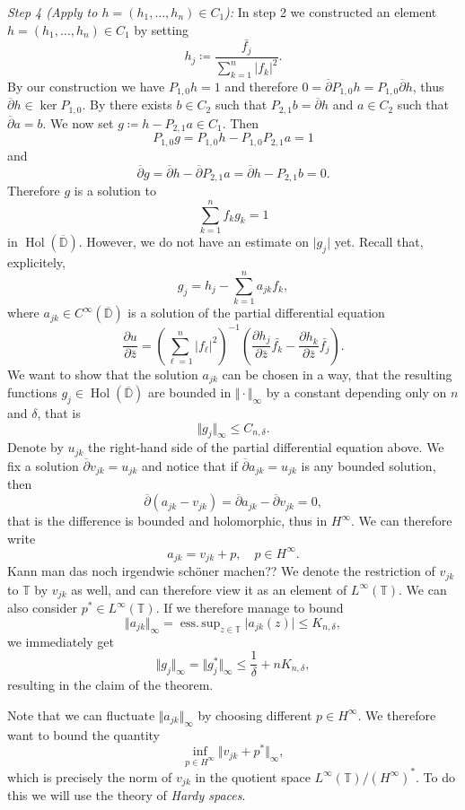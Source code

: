 \documentclass[letterpaper, 11pt]{article}
\newcommand{\D}{\mathbb{D}}
\newcommand{\T}{\mathbb{T}}
\newcommand{\1}{\mathds{1}}
\newcommand{\cl}[1]{\overline{#1}}
\newcommand{\Wirtzbar}[1][]{\frac{\partial #1}{\partial \bar{z}}}
\newcommand{\wirtzbar}{\overline{\partial}}
\DeclareMathOperator*{\Hol}{Hol}
\DeclareMathOperator*{\esssup}{ess.\,sup}
\newcommand{\todo}[1][Todo.]{{\color{red} #1}}
\theoremstyle{definition}
\newenvironment{innerproof}
 {\renewcommand{\qedsymbol}{}\proof}
 {\endproof}
\begin{document}
\begin{innerproof}[Proof (continued)]
  \textit{Step 4 (Apply to $h = (h_1, \dots, h_n) \in C_1$):} In step 2 we constructed an element $h = (h_1, \dots, h_n) \in C_1$ by setting
  $$ h_j \coloneqq \frac{\bar{f_j}}{\sum_{k=1}^n \vert f_k \vert^2}. $$
  By our construction we have $P_{1,0} h = 1$ and therefore $0 = \wirtzbar P_{1,0} h = P_{1,0} \wirtzbar h$, thus $\wirtzbar h \in \ker P_{1,0}$. By  there exists $b \in C_2$ such that $P_{2,1} b = \wirtzbar h$ and $a \in C_2$ such that $\wirtzbar a = b$. We now set $g \coloneqq h - P_{2,1} a \in C_1$. Then
  $$ P_{1,0} g = P_{1,0} h - P_{1,0} P_{2,1} a = 1 $$
  and
  $$ \wirtzbar g = \wirtzbar h - \wirtzbar P_{2,1} a = \wirtzbar h - P_{2,1} b = 0. $$
  Therefore $g$ is a solution to
  $$ \sum_{k=1}^n f_k g_k = 1 $$
  in $\Hol(\cl{\D})$. However, we do not have an estimate on $\vert g_j \vert$ yet. Recall that, explicitely,
  $$ g_j = h_j - \sum_{k=1}^n a_{jk} f_k, $$
  where $a_{jk} \in C^\infty(\cl{\D})$ is a solution of the partial differential equation
  $$ \Wirtzbar[u] = \left( \sum_{\ell=1}^n \vert f_\ell \vert^2 \right)^{-1} \left( \Wirtzbar[h_j] \bar{f_k} - \Wirtzbar[h_k] \bar{f_j} \right). $$
  We want to show that the solution $a_{jk}$ can be chosen in a way, that the resulting functions $g_j \in \Hol(\cl{\D})$ are bounded in $\Vert \cdot \Vert_\infty$ by a constant depending only on $n$ and $\delta$, that is
  $$ \Vert g_j \Vert_\infty \leq C_{n, \delta}. $$
  Denote by $u_{jk}$ the right-hand side of the partial differential equation above. We fix a solution $\wirtzbar v_{jk} = u_{jk}$ and notice that if $\wirtzbar a_{jk} = u_{jk}$ is any bounded solution, then
  $$ \wirtzbar (a_{jk} - v_{jk}) = \wirtzbar a_{jk} - \wirtzbar v_{jk} = 0, $$
  that is the difference is bounded and holomorphic, thus in $H^\infty$. We can therefore write
  $$ a_{jk} = v_{jk} + p, \quad p \in H^\infty. $$
  \todo[Kann man das noch irgendwie schöner machen??] We denote the restriction of $v_{jk}$ to $\T$ by $v_{jk}$ as well, and can therefore view it as an element of $L^\infty(\T)$. We can also consider $p^* \in L^\infty(\T)$. If we therefore manage to bound
  $$ \Vert a_{jk} \Vert_\infty = \esssup_{z \in \T} \vert a_{jk}(z) \vert \leq K_{n,\delta}, $$
  we immediately get
  $$ \Vert g_j \Vert_\infty = \Vert g_j^* \Vert_\infty \leq \frac{1}{\delta} + n K_{n, \delta}, $$
  resulting in the claim of the theorem.

  Note that we can fluctuate $\Vert a_{jk} \Vert_\infty$ by choosing different $p \in H^\infty$. We therefore want to bound the quantity
  $$ \inf_{p \in H^\infty} \Vert v_{jk} + p^* \Vert_\infty, $$
  which is precisely the norm of $v_{jk}$ in the quotient space $L^\infty(\T) / (H^\infty)^*$. To do this we will use the theory of \emph{Hardy spaces}.
\end{innerproof}
\end{document}

